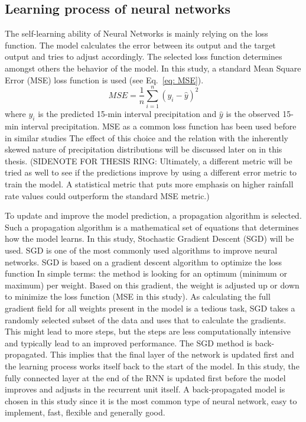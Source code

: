 \documentclass[twocolumn, 10pt, a4paper]{memoir}
\begin{document}
		\subsection{Learning process of neural networks} \label{Learning NN}
		The self-learning ability of Neural Networks is mainly relying on the loss function. The model calculates the error between its output and the target output and tries to adjust accordingly. The selected loss function determines amongst others the behavior of the model. In this study, a standard Mean Square Error (MSE) loss function is used (see Eq.~\ref{eq: MSE}). 
		\begin{equation} \label{eq: MSE}
			\label{eq: testequation}
			MSE = \frac{1}{n} \sum_{i=1}^{n} (y_i - \hat{y})^2
		\end{equation}
		where ${y_i}$ is the predicted 15-min interval precipitation and $\hat{y}$ is the observed 15-min interval precipitation.
		MSE as a common loss function has been used before in similar studies \cite{Pudashine2020, Diba2021}
		The effect of this choice and the relation with the inherently skewed nature of precipitation distributions will be discussed later on in this thesis. 
		(SIDENOTE FOR THESIS RING: Ultimately, a different metric will be tried as well to see if the predictions improve by using a different error metric to train the model. A statistical metric that puts more emphasis on higher rainfall rate values could outperform the standard MSE metric.)
		
		To update and improve the model prediction, a propagation algorithm is selected. Such a propagation algorithm is a mathematical set of equations that determines how the model learns. In this study, Stochastic Gradient Descent (SGD) will be used. SGD is one of the most commonly used algorithms to improve neural networks. SGD is based on a gradient descent algorithm to optimize the loss function In simple terms: the method is looking for an optimum (minimum or maximum) per weight. Based on this gradient, the weight is adjusted up or down to minimize the loss function (MSE in this study). As calculating the full gradient field for all weights present in the model is a tedious task, SGD takes a randomly selected subset of the data and uses that to calculate the gradients. This might lead to more steps, but the steps are less computationally intensive and typically lead to an improved performance.  
		The SGD method is back-propagated. This implies that the final layer of the network is updated first and the learning process works itself back to the start of the model. In this study, the fully connected layer at the end of the RNN is updated first before the model improves and adjusts in the recurrent unit itself. A back-propagated model is chosen in this study since it is the most common type of neural network, easy to implement, fast, flexible and generally good. 
		 
\end{document}
